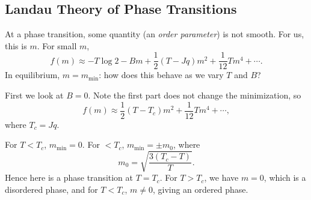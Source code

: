 \documentclass[12pt]{article}
\begin{document}
\subsection{Landau Theory of Phase Transitions}%
\label{sub:pt}

At a phase transition, some quantity (an \emph{order parameter}) is not smooth. For us, this is $m$. For small $m$,
\[
f(m) \approx -T \log 2 - B m + \frac{1}{2} (T - Jq)m^2 + \frac{1}{12} Tm^4 + \cdots.
\]
In equilibrium, $m = m_{\mathrm{min}}$: how does this behave as we vary $T$ and $B$?

First we look at $B = 0$. Note the first part does not change the minimization, so
\[
f(m) \approx \frac{1}{2} (T - T_c)m^2 + \frac{1}{12} Tm^4 + \cdots,
\]
where $T_c = Jq$.


For $T < T_c$, $m_{\mathrm{min}} = 0$. For $ < T_c$, $m_{\mathrm{min}} = \pm m_0$, where
\[
	m_0 = \sqrt{\frac{3 (T_c - T)}{T}}.
\]
Hence here is a phase transition at $T = T_c$. For $T > T_c$, we have $m =  0$, which is a disordered phase, and for $T < T_c$, $m \neq 0$, giving an ordered phase.
\end{document}
